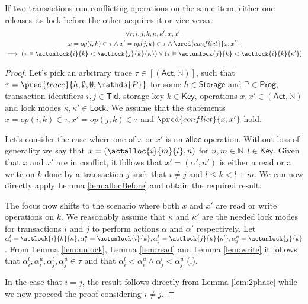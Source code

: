 \lem \label{lem:conflict} If two transactions run conflicting operations on the same item, either one releases its lock before the other acquires it or vice versa.
\begin{gather*}
\forall \tau, i, j, k, \kappa, \kappa', x, x' \ldotp \\
x = op(i, k) \in \tau \land x' = op(j, k) \in \tau \land \pred{conflict}{x, x'} \\
\implies \left( \tau \vDash \actunlock{i}{k} < \actlock{j}{k}{\kappa} \right) \lor \left( \tau \vDash \actunlock{j}{k} < \actlock{i}{k}{\kappa'} \right)
\end{gather*}

\begin{proof}
Let's pick an arbitrary trace $\tau \in [(\mathsf{Act}, \mathds{N})]$, such that $\tau = \pred{trace}{h, \emptyset, \emptyset, \mathds{P}}$ for some $h \in \mathsf{Storage}$ and $\mathds{P} \in \mathsf{Prog}$, transaction identifiers $i, j \in \mathsf{Tid}$, storage key $k \in \mathsf{Key}$, operations $x, x' \in (\mathsf{Act}, \mathds{N})$ and lock modes $\kappa, \kappa' \in \mathsf{Lock}$. We assume that the statements $x = op(i, k) \in \tau, x' = op(j, k) \in \tau$ and $\pred{conflict}{x, x'}$ hold.

Let's consider the case where one of $x$ or $x'$ is an $\mathsf{alloc}$ operation. Without loss of generality we say that $x = (\actalloc{i}{m}{l}, n)$ for $n, m \in \mathds{N}, l \in \mathsf{Key}$. Given that $x$ and $x'$ are in conflict, it follows that $x' = (\alpha', n')$ is either a read or a write on $k$ done by a transaction $j$ such that $i \neq j$ and $l \leq k < l + m$. We can now directly apply Lemma \ref{lem:allocBefore} and obtain the required result.

The focus now shifts to the scenario where both $x$ and $x'$ are read or write operations on $k$. We  reasonably assume that $\kappa$ and $\kappa'$ are the needed lock modes for transactions $i$ and $j$ to perform actions $\alpha$ and $\alpha'$ respectively. Let $\alpha_i^l = \actlock{i}{k}{\kappa}, \alpha_i^u = \actunlock{i}{k}, \alpha_j^l = \actlock{j}{k}{\kappa'}, \alpha_j^u = \actunlock{j}{k}$. From Lemma \ref{lem:unlock}, Lemma \ref{lem:read} and Lemma \ref{lem:write} it follows that $\alpha_i^l, \alpha_i^u, \alpha_j^l, \alpha_j^u \in \tau$ and that $\alpha_i^l < \alpha_i^u \land \alpha_j^l < \alpha_j^u$ (\textsc{i}).

In the case that $i = j$, the result follows directly from Lemma \ref{lem:2phase} while we now proceed the proof considering $i \neq j$.


\end{proof}
